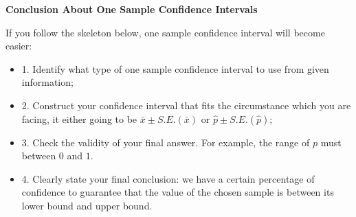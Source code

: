 \noindent
\textbf{Conclusion About One Sample Confidence Intervals}

\noindent
If you follow the skeleton below, one sample confidence interval will become easier:

\begin{itemize}
	\item 1. Identify what type of one sample confidence interval to use from given information;
	\item 2. Construct your confidence interval that fits the circumstance which you are facing, it either going to be $\bar{x}  \pm S.E.(\bar{x})\text{ or } \hat{p}  \pm S.E.(\hat{p});$
	\item 3. Check the validity of your final answer. For example, the range of $p$ must between $0$ and $1$.
	\item 4. Clearly state your final conclusion: we have a certain percentage of confidence to guarantee that the value of the chosen sample is between its lower bound and upper bound.
\end{itemize}



